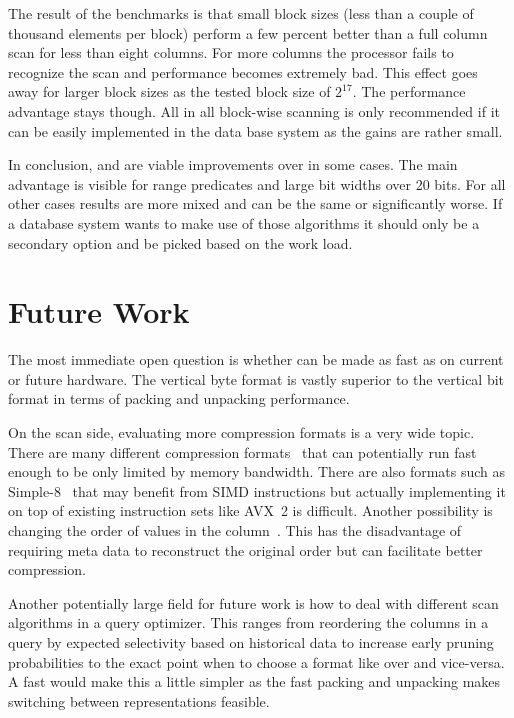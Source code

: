 The result of the benchmarks is that small block sizes (less than a couple of
thousand elements per block) perform a few percent better than a full column
scan for less than eight columns. For more columns the processor fails to
recognize the scan and performance becomes extremely bad. This effect goes away
for larger block sizes as the tested block size of $2^{17}$. The performance
advantage stays though. All in all block-wise scanning is only recommended if
it can be easily implemented in the data base system as the gains are rather
small.

In conclusion, \bwv{} and \bs{} are viable improvements over \simdscan{} in
some cases. The main advantage is visible for range predicates and large bit
widths over 20 bits. For all other cases results are more mixed and can be the
same or significantly worse. If a database system wants to make use of those
algorithms it should only be a secondary option and be picked based on the work
load.

\section{Future Work}

The most immediate open question is whether \bs{} can be made as fast as \bwv{}
on current or future hardware. The vertical byte format is vastly superior to
the vertical bit format in terms of packing and unpacking performance.

On the scan side, evaluating more compression formats is a very wide topic.
There are many different compression formats~\cite{lemire2015decoding} that can
potentially run fast enough to be only limited by memory bandwidth. There are
also formats such as Simple-8~\cite{Simple8} that may benefit from SIMD
instructions but actually implementing it on top of existing instruction sets
like AVX~2 is difficult. Another possibility is changing the order of values in
the column~\cite{markl1999variable}. This has the disadvantage of requiring meta
data to reconstruct the original order but can facilitate better compression.

Another potentially large field for future work is how to deal with different
scan algorithms in a query optimizer. This ranges from reordering the columns in
a query by expected selectivity based on historical data to increase early
pruning probabilities to the exact point when to choose a format like \bwv{}
over \simdscan{} and vice-versa. A fast \bs{} would make this a little simpler
as the fast packing and unpacking makes switching between representations
feasible.

